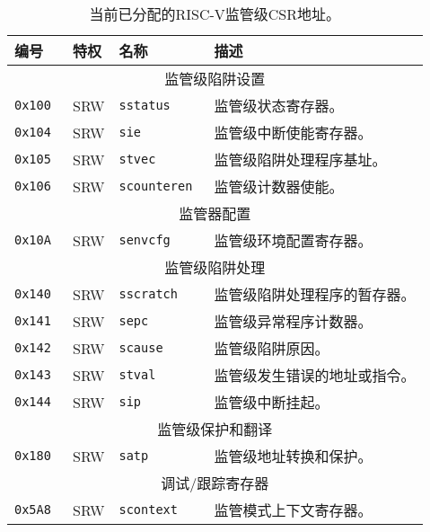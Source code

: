 \begin{table}[htb!]
\begin{center}
\begin{tabular}{|l|l|l|l|}
\hline
编号    & 特权      & 名称          & 描述 \\
\hline
\multicolumn{4}{|c|}{监管级陷阱设置} \\
\hline
\tt 0x100 & SRW  &\tt sstatus    & 监管级状态寄存器。 \\
\tt 0x104 & SRW  &\tt sie        & 监管级中断使能寄存器。\\
\tt 0x105 & SRW  &\tt stvec      & 监管级陷阱处理程序基址。 \\
\tt 0x106 & SRW  &\tt scounteren & 监管级计数器使能。 \\
\hline
\multicolumn{4}{|c|}{监管器配置} \\
\hline
\tt 0x10A & SRW  &\tt senvcfg    & 监管级环境配置寄存器。 \\
\hline
\multicolumn{4}{|c|}{监管级陷阱处理} \\
\hline
\tt 0x140 & SRW  &\tt sscratch   & 监管级陷阱处理程序的暂存器。 \\
\tt 0x141 & SRW  &\tt sepc       & 监管级异常程序计数器。 \\
\tt 0x142 & SRW  &\tt scause     & 监管级陷阱原因。 \\
\tt 0x143 & SRW  &\tt stval      & 监管级发生错误的地址或指令。 \\
\tt 0x144 & SRW  &\tt sip        & 监管级中断挂起。 \\
\hline
\multicolumn{4}{|c|}{监管级保护和翻译} \\
\hline
\tt 0x180 & SRW  &\tt satp       & 监管级地址转换和保护。 \\
\hline
\multicolumn{4}{|c|}{调试/跟踪寄存器} \\
\hline
\tt 0x5A8 & SRW &\tt scontext & 监管模式上下文寄存器。 \\
\hline
\end{tabular}
\end{center}
\caption{当前已分配的RISC-V监管级CSR地址。
    }
\label{scsrnames}
\end{table}


